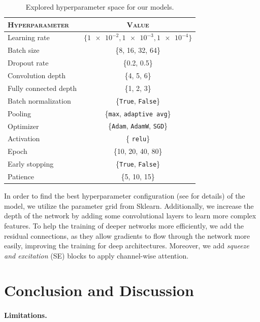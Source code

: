 \begin{table}[ht]
  \centering
  \begin{tabular}{@{}lc@{}}
    \toprule
    \textsc{Hyperparameter} & \textsc{Value} \\
    \midrule
    Learning rate & $ \{\num{1e-2}, \num{1e-3}, \num{1e-4} \} $ \\
    Batch size & \{8, 16, 32, 64\} \\
    Dropout rate & \{0.2, 0.5\} \\
    Convolution depth & \{4, 5, 6\} \\
    Fully connected depth & \{1, 2, 3\} \\
    Batch normalization & \{\texttt{True}, \texttt{False}\} \\
    Pooling & \{\texttt{max}, \texttt{adaptive avg}\} \\
    Optimizer & \{\texttt{Adam}, \texttt{AdamW}, \texttt{SGD}\} \\
    Activation & \{ \texttt{relu}\} \\ %
    Epoch & \{10, 20, 40, 80\} \\
    Early stopping & \{\texttt{True}, \texttt{False}\} \\
    Patience & \{5, 10, 15\} \\
    \bottomrule
  \end{tabular}
  \caption{Explored hyperparameter space for our models.}
  \label{tab:hyper}
\end{table}

In order to find the best hyperparameter configuration (see  for details) of the model, 
we utilize the parameter grid from Sklearn.
Additionally, 
we increase the depth of the network by adding some convolutional layers to learn more complex features. 
To help the training of deeper networks more efficiently, 
we add the residual connections, 
as they allow gradients to flow through the network more easily, 
improving the training for deep architectures. 
Moreover, 
we add \textit{squeeze and excitation} (SE) blocks to apply channel-wise attention. 

\section{Conclusion and Discussion}
\label{sec:conclusion}

\paragraph{Limitations.}

\newpage
